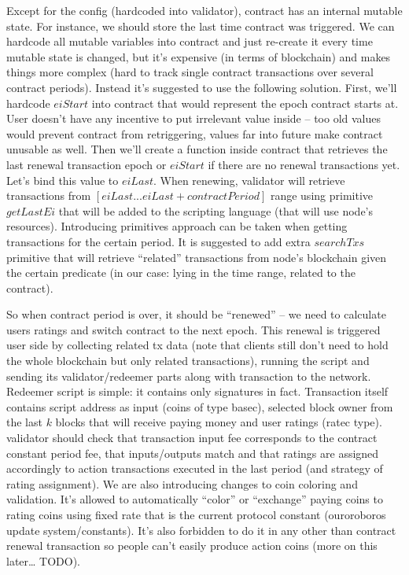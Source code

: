 \documentclass[]{itmo-student-thesis}
\begin{document}
Except for the config (hardcoded into validator), contract has an
internal mutable state. For instance, we should store the last time
contract was triggered. We can hardcode all mutable variables into
contract and just re-create it every time mutable state is changed,
but it’s expensive (in terms of blockchain) and makes things more
complex (hard to track single contract transactions over several
contract periods). Instead it’s suggested to use the following
solution. First, we’ll hardcode $eiStart$ into contract that would
represent the epoch contract starts at. User doesn’t have any
incentive to put irrelevant value inside -- too old values would
prevent contract from retriggering, values far into future make
contract unusable as well. Then we’ll create a function inside
contract that retrieves the last renewal transaction epoch or
$eiStart$ if there are no renewal transactions yet. Let’s bind this
value to $eiLast$. When renewing, validator will retrieve transactions
from $[eiLast...eiLast+contractPeriod]$ range using primitive
$getLastEi$ that will be added to the scripting language (that will
use node’s resources). Introducing primitives approach can be taken
when getting transactions for the certain period. It is suggested to
add extra $searchTxs$ primitive that will retrieve “related”
transactions from node’s blockchain given the certain predicate (in
our case: lying in the time range, related to the contract).

So when contract period is over, it should be “renewed” -- we need to
calculate users ratings and switch contract to the next epoch. This
renewal is triggered user side by collecting related tx data (note
that clients still don’t need to hold the whole blockchain but only
related transactions), running the script and sending its
validator/redeemer parts along with transaction to the
network. Redeemer script is simple: it contains only signatures in
fact. Transaction itself contains script address as input (coins of
type basec), selected block owner from the last $k$ blocks that will
receive paying money and user ratings (ratec type). validator should
check that transaction input fee corresponds to the contract constant
period fee, that inputs/outputs match and that ratings are assigned
accordingly to action transactions executed in the last period (and
strategy of rating assignment). We are also introducing changes to
coin coloring and validation. It’s allowed to automatically “color” or
“exchange” paying coins to rating coins using fixed rate that is the
current protocol constant (ouroroboros update system/constants). It’s
also forbidden to do it in any other than contract renewal transaction
so people can’t easily produce action coins (more on this later…
TODO).
\end{document}
